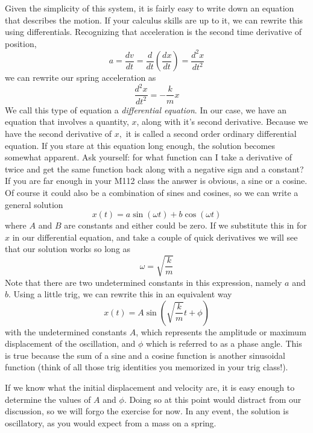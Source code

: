\documentclass[twoside,11pt,ShortChapTitles]{BYUTextbook}
\begin{document}
Given the simplicity of this system, it is fairly easy to write down an
equation that describes the motion. If your calculus skills are up to it, we
can rewrite this using differentials. Recognizing that acceleration is the
second time derivative of position, 
\[
a=\frac{dv}{dt}=\frac{d}{dt}\left( \frac{dx}{dt}\right) =\frac{d^{2}x}{dt^{2}%
} 
\]%
we can rewrite our spring acceleration as 
\[
\frac{d^{2}x}{dt^{2}}=-\frac{k}{m}x 
\]%
We call this type of equation a \emph{differential equation}. In our case,
we have an equation that involves a quantity, $x$, along with it's second
derivative. Because we have the second derivative of $x,$ it is called a
second order ordinary differential equation. If you stare at this equation
long enough, the solution becomes somewhat apparent. Ask yourself: for what
function can I take a derivative of twice and get the same function back
along with a negative sign and a constant? If you are far enough in your
M112 class the answer is obvious, a sine or a cosine. Of course it could also be a
combination of sines and cosines, so we can write a general solution 
\[
x(t)=a\sin \left( \omega t\right) +b\cos \left( \omega t\right) 
\]%
where $A$ and $B$ are constants and either could be zero. If we substitute
this in for $x$ in our differential equation, and take a couple of quick
derivatives we will see that our solution works so long as 
\[
\omega =\sqrt{\frac{k}{m}} 
\]%
Note that there are two undetermined constants in this expression, namely $a$
and $b$. Using a little trig, we can rewrite this in an equivalent way 
\[
x(t)=A\sin \left( \sqrt{\frac{k}{m}}t+\phi \right) 
\]%
with the undetermined constants $A$, which represents the amplitude or
maximum displacement of the oscillation, and $\phi $ which is referred to as
a phase angle. This is true because the sum of a sine and a cosine function
is another sinusoidal function (think of all those trig identities you
memorized in your trig class!).

If we know what the initial displacement and velocity are, it is easy enough
to determine the values of $A$ and $\phi $. Doing so at this point would
distract from our discussion, so we will forgo the exercise for now. In any
event, the solution is oscillatory, as you would expect from a mass on a
spring.
\end{document}
